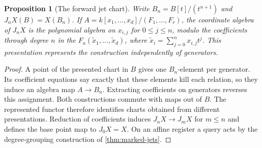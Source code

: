 \documentclass[11pt,a4paper]{article}
\newtheorem{proposition}[proposition]{Proposition}
\theoremstyle{definition}
\theoremstyle{remark}\newaliascnt{remark}{theorem}
\numberwithin{equation}{section}
\begin{document}
\begin{proposition}[The forward jet chart]\label{prop:jet-chart}
Write $B_n=B[t]/(t^{n+1})$ and $J_nX(B)=X(B_n)$. If $A=k[x_1,\dots,x_d]/(F_1,\dots,F_r)$, the coordinate algebra of $J_nX$ is the polynomial algebra on $x_{i,j}$ for $0\le j\le n$, modulo the coefficients through degree $n$ in the $F_a(\widetilde x_1,\ldots,\widetilde x_d)$, where $\widetilde x_i=\sum_{j=0}^n x_{i,j}t^j$. This presentation represents the construction independently of generators.
\end{proposition}
\begin{proof}
A point of the presented chart in $B$ gives one $B_n$-element per generator. Its coefficient equations say exactly that these elements kill each relation, so they induce an algebra map $A\to B_n$. Extracting coefficients on generators reverses this assignment. Both constructions commute with maps out of $B$. The represented functor therefore identifies charts obtained from different presentations. Reduction of coefficients induces $J_nX\to J_mX$ for $m\le n$ and defines the base point map to $J_0X=X$. On an affine register a query acts by the degree-grouping construction of \cref{thm:marked-jets}.
\end{proof}
\end{document}
